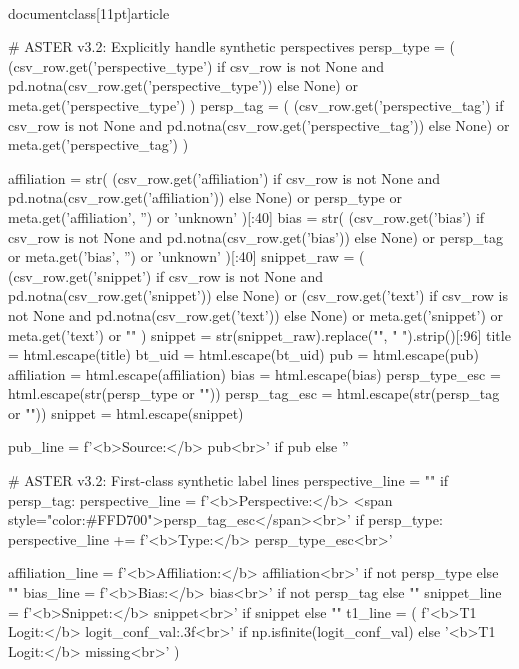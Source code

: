 \\documentclass[11pt]{article}
\begin{document}
\begin{CodeBlock}
{{{{{        # ASTER v3.2: Explicitly handle synthetic perspectives
        persp_type = (
            (csv_row.get('perspective_type') if csv_row is not None and pd.notna(csv_row.get('perspective_type')) else None)
            or meta.get('perspective_type')
        )
        persp_tag = (
            (csv_row.get('perspective_tag') if csv_row is not None and pd.notna(csv_row.get('perspective_tag')) else None)
            or meta.get('perspective_tag')
        )

        affiliation = str(
            (csv_row.get('affiliation') if csv_row is not None and pd.notna(csv_row.get('affiliation')) else None)
            or persp_type
            or meta.get('affiliation', '')
            or 'unknown'
        )[:40]
        bias = str(
            (csv_row.get('bias') if csv_row is not None and pd.notna(csv_row.get('bias')) else None)
            or persp_tag
            or meta.get('bias', '')
            or 'unknown'
        )[:40]
        snippet_raw = (
            (csv_row.get('snippet') if csv_row is not None and pd.notna(csv_row.get('snippet')) else None)
            or (csv_row.get('text') if csv_row is not None and pd.notna(csv_row.get('text')) else None)
            or meta.get('snippet')
            or meta.get('text')
            or ""
        )
        snippet = str(snippet_raw).replace("\n", " ").strip()[:96]
        title = html.escape(title)
        bt_uid = html.escape(bt_uid)
        pub = html.escape(pub)
        affiliation = html.escape(affiliation)
        bias = html.escape(bias)
        persp_type_esc = html.escape(str(persp_type or ""))
        persp_tag_esc = html.escape(str(persp_tag or ""))
        snippet = html.escape(snippet)
        
        pub_line = f'<b>Source:</b> {pub}<br>' if pub else ''
        
        # ASTER v3.2: First-class synthetic label lines
        perspective_line = ""
        if persp_tag:
            perspective_line = f'<b>Perspective:</b> <span style="color:#FFD700">{persp_tag_esc}</span><br>'
        if persp_type:
            perspective_line += f'<b>Type:</b> {persp_type_esc}<br>'

        affiliation_line = f'<b>Affiliation:</b> {affiliation}<br>' if not persp_type else ""
        bias_line = f'<b>Bias:</b> {bias}<br>' if not persp_tag else ""
        snippet_line = f'<b>Snippet:</b> {snippet}<br>' if snippet else ""
        t1_line = (
            f'<b>T1 Logit:</b> {logit_conf_val:.3f}<br>'
            if np.isfinite(logit_conf_val)
            else '<b>T1 Logit:</b> missing<br>'
        )

}}}}}
\end{CodeBlock}
\end{document}
